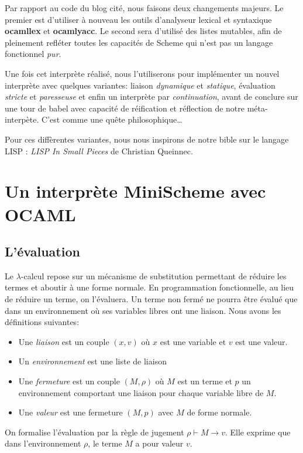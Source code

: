 \documentclass[11pt]{book}
\begin{document}
Par rapport au code du blog cité, nous faisons deux changements majeurs. Le premier est d'utiliser à nouveau
les outils d'analyseur lexical et syntaxique \textbf{ocamllex} et \textbf{ocamlyacc}. 
Le second sera d'utilisé des listes mutables, afin de pleinement refléter toutes les capacités de Scheme qui n'est
pas un langage fonctionnel \textit{pur}.

Une fois cet interprète réalisé, nous l'utiliserons pour implémenter un nouvel interprète avec quelques variantes:
liaison \textit{dynamique} et \textit{statique}, évaluation \textit{stricte} et \textit{paresseuse} 
et enfin un interprète par \textit{continuation}, avant de conclure sur une tour de babel avec capacité de réification
et réflection de notre méta-interpète. C'est comme une quête philosophique\dots

Pour ces diffèrentes variantes, nous nous inspirons de notre bible sur le langage LISP : \textit{LISP In Small Pieces} de Christian Queinnec.
\cite{lisp}

\section{Un interprète MiniScheme avec OCAML}

\subsection{L'évaluation}
Le $\lambda$-calcul repose sur un mécanisme de substitution permettant de réduire les termes et
aboutir à une forme normale. En programmation fonctionnelle, au lieu de réduire un terme, on
l'évaluera. Un terme non fermé ne pourra être évalué que dans un environnement où ses 
variables libres ont une liaison. Nous avons les définitions suivantes:
\begin{itemize}
	\item Une \textit{liaison} est un couple $(x,v)$ où $x$ est une variable et $v$ est une valeur.
	\item Un \textit{environnement} est une liste de liaison
	\item Une \textit{fermeture} est un couple $(M,\rho)$ où $M$ est un terme et $p$ un environnement 
	comportant une liaison pour chaque variable libre de $M$.
	\item Une \textit{valeur} est une fermeture $(M,p)$ avec $M$ de forme normale.
\end{itemize}
On formalise l'évaluation par la règle de jugement $\rho \vdash M \rightarrow v$. Elle exprime
que dans l'environnement $\rho$, le terme $M$ a pour valeur $v$.
\end{document}
